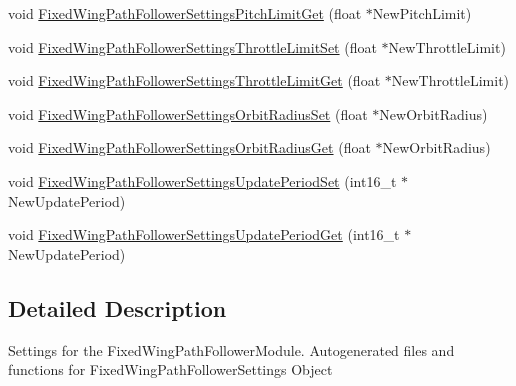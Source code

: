 \begin{DoxyCompactItemize}
\item 
void \hyperlink{group___fixed_wing_path_follower_settings_gaf37afb9839f2b64e58b2d13e2ad6ad19}{\-Fixed\-Wing\-Path\-Follower\-Settings\-Pitch\-Limit\-Get} (float $\ast$\-New\-Pitch\-Limit)
\item 
void \hyperlink{group___fixed_wing_path_follower_settings_ga2bed4e3360c56a652c7cd32da3522143}{\-Fixed\-Wing\-Path\-Follower\-Settings\-Throttle\-Limit\-Set} (float $\ast$\-New\-Throttle\-Limit)
\item 
void \hyperlink{group___fixed_wing_path_follower_settings_ga5cf25754ffe23ba6235112a727e090c1}{\-Fixed\-Wing\-Path\-Follower\-Settings\-Throttle\-Limit\-Get} (float $\ast$\-New\-Throttle\-Limit)
\item 
void \hyperlink{group___fixed_wing_path_follower_settings_ga057de0b27c7e2d23086c77510d2cafda}{\-Fixed\-Wing\-Path\-Follower\-Settings\-Orbit\-Radius\-Set} (float $\ast$\-New\-Orbit\-Radius)
\item 
void \hyperlink{group___fixed_wing_path_follower_settings_ga1cbf42f44c5b57ebc48280bc10fc3f8c}{\-Fixed\-Wing\-Path\-Follower\-Settings\-Orbit\-Radius\-Get} (float $\ast$\-New\-Orbit\-Radius)
\item 
void \hyperlink{group___fixed_wing_path_follower_settings_ga027250f0207ebc855a2fad8d4848a27c}{\-Fixed\-Wing\-Path\-Follower\-Settings\-Update\-Period\-Set} (int16\-\_\-t $\ast$\-New\-Update\-Period)
\item 
void \hyperlink{group___fixed_wing_path_follower_settings_ga7a3200c3f955432e6e08f1acc4b5922c}{\-Fixed\-Wing\-Path\-Follower\-Settings\-Update\-Period\-Get} (int16\-\_\-t $\ast$\-New\-Update\-Period)
\end{DoxyCompactItemize}


\subsection{\-Detailed \-Description}
\-Settings for the \-Fixed\-Wing\-Path\-Follower\-Module. \-Autogenerated files and functions for \-Fixed\-Wing\-Path\-Follower\-Settings \-Object 

